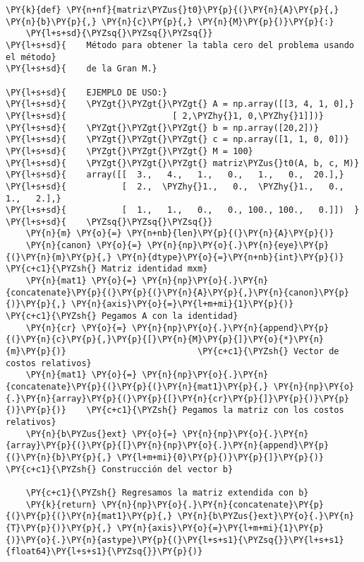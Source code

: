\begin{tcolorbox}[breakable, size=fbox, boxrule=1pt, pad at break*=1mm,colback=cellbackground, colframe=cellborder]
\begin{Verbatim}[commandchars=\\\{\}]
\PY{k}{def} \PY{n+nf}{matriz\PYZus{}t0}\PY{p}{(}\PY{n}{A}\PY{p}{,} \PY{n}{b}\PY{p}{,} \PY{n}{c}\PY{p}{,} \PY{n}{M}\PY{p}{)}\PY{p}{:}
    \PY{l+s+sd}{\PYZsq{}\PYZsq{}\PYZsq{}}
\PY{l+s+sd}{    Método para obtener la tabla cero del problema usando el método}
\PY{l+s+sd}{    de la Gran M.}

\PY{l+s+sd}{    EJEMPLO DE USO:}
\PY{l+s+sd}{    \PYZgt{}\PYZgt{}\PYZgt{} A = np.array([[3, 4, 1, 0],}
\PY{l+s+sd}{                     [ 2,\PYZhy{}1, 0,\PYZhy{}1]])}
\PY{l+s+sd}{    \PYZgt{}\PYZgt{}\PYZgt{} b = np.array([20,2])}
\PY{l+s+sd}{    \PYZgt{}\PYZgt{}\PYZgt{} c = np.array([1, 1, 0, 0])}
\PY{l+s+sd}{    \PYZgt{}\PYZgt{}\PYZgt{} M = 100}
\PY{l+s+sd}{    \PYZgt{}\PYZgt{}\PYZgt{} matriz\PYZus{}t0(A, b, c, M)}
\PY{l+s+sd}{    array([[  3.,   4.,   1.,   0.,   1.,   0.,  20.],}
\PY{l+s+sd}{           [  2.,  \PYZhy{}1.,   0.,  \PYZhy{}1.,   0.,   1.,   2.],}
\PY{l+s+sd}{           [  1.,   1.,   0.,   0., 100., 100.,   0.]])  }
\PY{l+s+sd}{    \PYZsq{}\PYZsq{}\PYZsq{}}
    \PY{n}{m} \PY{o}{=} \PY{n+nb}{len}\PY{p}{(}\PY{n}{A}\PY{p}{)}
    \PY{n}{canon} \PY{o}{=} \PY{n}{np}\PY{o}{.}\PY{n}{eye}\PY{p}{(}\PY{n}{m}\PY{p}{,} \PY{n}{dtype}\PY{o}{=}\PY{n+nb}{int}\PY{p}{)}                     \PY{c+c1}{\PYZsh{} Matriz identidad mxm}
    \PY{n}{mat1} \PY{o}{=} \PY{n}{np}\PY{o}{.}\PY{n}{concatenate}\PY{p}{(}\PY{p}{(}\PY{n}{A}\PY{p}{,}\PY{n}{canon}\PY{p}{)}\PY{p}{,} \PY{n}{axis}\PY{o}{=}\PY{l+m+mi}{1}\PY{p}{)}         \PY{c+c1}{\PYZsh{} Pegamos A con la identidad}
    \PY{n}{cr} \PY{o}{=} \PY{n}{np}\PY{o}{.}\PY{n}{append}\PY{p}{(}\PY{n}{c}\PY{p}{,}\PY{p}{[}\PY{n}{M}\PY{p}{]}\PY{o}{*}\PY{n}{m}\PY{p}{)}                          \PY{c+c1}{\PYZsh{} Vector de costos relativos}
    \PY{n}{mat1} \PY{o}{=} \PY{n}{np}\PY{o}{.}\PY{n}{concatenate}\PY{p}{(}\PY{p}{(}\PY{n}{mat1}\PY{p}{,} \PY{n}{np}\PY{o}{.}\PY{n}{array}\PY{p}{(}\PY{p}{[}\PY{n}{cr}\PY{p}{]}\PY{p}{)}\PY{p}{)}\PY{p}{)}    \PY{c+c1}{\PYZsh{} Pegamos la matriz con los costos relativos}
    \PY{n}{b\PYZus{}ext} \PY{o}{=} \PY{n}{np}\PY{o}{.}\PY{n}{array}\PY{p}{(}\PY{p}{[}\PY{n}{np}\PY{o}{.}\PY{n}{append}\PY{p}{(}\PY{n}{b}\PY{p}{,} \PY{l+m+mi}{0}\PY{p}{)}\PY{p}{]}\PY{p}{)}              \PY{c+c1}{\PYZsh{} Construcción del vector b}
    
    \PY{c+c1}{\PYZsh{} Regresamos la matriz extendida con b}
    \PY{k}{return} \PY{n}{np}\PY{o}{.}\PY{n}{concatenate}\PY{p}{(}\PY{p}{(}\PY{n}{mat1}\PY{p}{,} \PY{n}{b\PYZus{}ext}\PY{o}{.}\PY{n}{T}\PY{p}{)}\PY{p}{,} \PY{n}{axis}\PY{o}{=}\PY{l+m+mi}{1}\PY{p}{)}\PY{o}{.}\PY{n}{astype}\PY{p}{(}\PY{l+s+s1}{\PYZsq{}}\PY{l+s+s1}{float64}\PY{l+s+s1}{\PYZsq{}}\PY{p}{)}
\end{Verbatim}
\end{tcolorbox}

